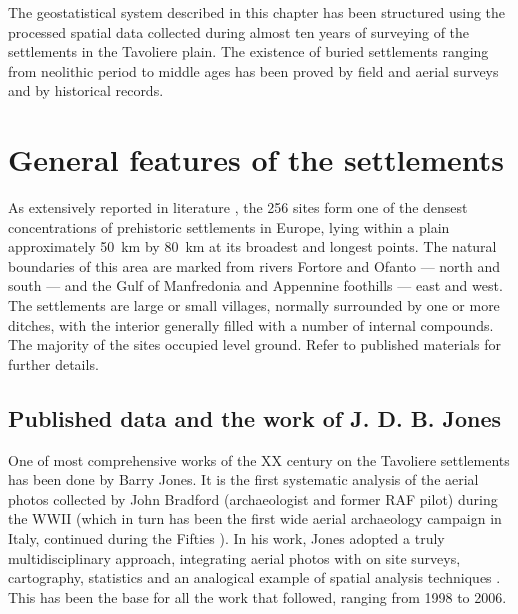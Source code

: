     The geostatistical system described in this chapter has been structured using the processed spatial data collected during almost ten years of surveying of the settlements in the Tavoliere plain. The existence of buried settlements ranging from neolithic period to middle ages has been proved by field and aerial surveys and by historical records.

    \section{General features of the settlements}
        As extensively reported in literature \cite{intro-tavoliere}, the 256 sites form one of the densest concentrations of prehistoric settlements in Europe, lying within a plain approximately \SI{50}{\kilo\meter} by \SI{80}{\kilo\meter} at its broadest and longest points. The natural boundaries of this area are marked from rivers Fortore and Ofanto --- north and south --- and the Gulf of Manfredonia and Appennine foothills --- east and west.\\
        The settlements are large or small villages, normally surrounded by one or more ditches, with the interior generally filled with a number of internal compounds. The majority of the sites occupied level ground. Refer to published materials for further details.

        \subsection{Published data and the work of J. D. B. Jones\label{sec:jones}}
            One of most comprehensive works of the XX century on the Tavoliere settlements has been done by Barry Jones. It is the first systematic analysis of the aerial photos collected by John Bradford (archaeologist and former RAF pilot) during the WWII (which in turn has been the first wide aerial archaeology campaign in Italy, continued during the Fifties \cite[pp.~x-xi]{jones-tavoliere}). In his work, Jones adopted a truly multidisciplinary approach, integrating aerial photos with on site surveys, cartography, statistics and an analogical example of spatial analysis techniques \cite[p.~188]{jones-tavoliere}. This has been the base for all the work that followed, ranging from 1998 to 2006.

